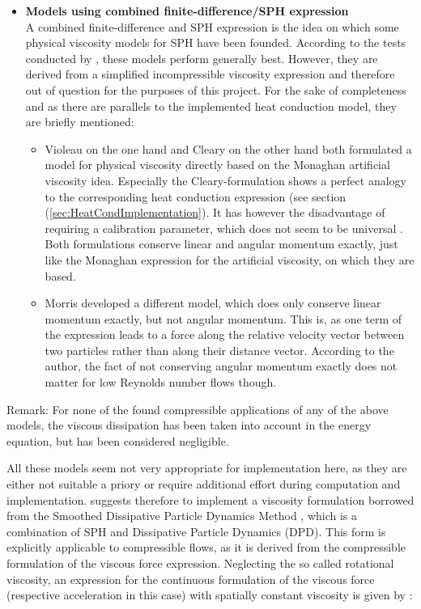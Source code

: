 \documentclass{report}
\begin{document}
\begin{itemize}
\item {\bf Models using combined finite-difference/SPH expression}\\
A combined finite-difference and SPH expression is the idea on which some physical viscosity models for SPH have been founded. According to the tests conducted by \cite{Basa2009}, these models perform generally best. However, they are derived from a simplified incompressible viscosity expression and therefore out of question for the purposes of this project. For the sake of completeness and as there are parallels to the implemented heat conduction model, they are briefly mentioned:
\begin{itemize}
 \item Violeau on the one hand and Cleary on the other hand both formulated a model for physical viscosity directly based on the Monaghan artificial viscosity idea. Especially the Cleary-formulation shows a perfect analogy to the corresponding heat conduction expression (see section (\ref{sec:HeatCondImplementation}).
 It has however the disadvantage of requiring a calibration parameter, which does not seem to be universal \cite{Basa2009}.
Both formulations conserve linear and angular momentum exactly, just like the Monaghan expression for the artificial viscosity, on which they are based.	
\item Morris \cite{Morris1997} developed a different model, which does only conserve linear momentum exactly, but not angular momentum. This is, as one term of the expression leads to a force along the relative velocity vector between two particles rather than along their distance vector. According to the author, the fact of not conserving angular momentum exactly does not matter for low Reynolds number flows though. 

\end{itemize}
\end{itemize}

Remark: For none of the found compressible applications of any of the above models, the viscous dissipation has been taken into account in the energy equation, but has been considered negligible.

All these models seem not very appropriate for implementation here, as they are either not suitable a priory or require additional effort during computation and implementation.
\cite{LitvinovPersCom} suggests therefore to implement a viscosity formulation borrowed from the Smoothed Dissipative Particle Dynamics Method \cite{Espanol2003}, which is a combination of SPH and Dissipative Particle Dynamics (DPD). This form is explicitly applicable to compressible flows, as it is derived from the compressible formulation of the viscous force expression.
Neglecting the so called rotational viscosity, an expression for the continuous formulation of the viscous force (respective acceleration in this case) with spatially constant viscosity is given by  \cite{deGroot1962}:
\end{document}
